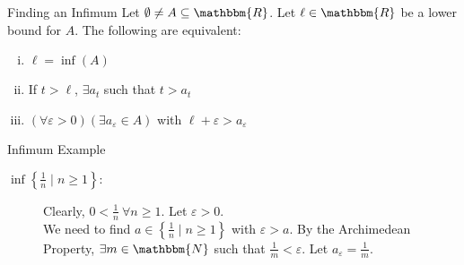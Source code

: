 \documentclass[10pt]{extarticle}
\newcommand{\N}{\mathbbm{N}}
\newcommand{\R}{\mathbbm{R}}
\begin{document}
  \begin{problem}{Finding an Infimum}
    Let $\emptyset \neq A \subseteq \R$. Let $\ell \in \R$ be a lower bound for $A$. The following are equivalent:
    \begin{enumerate}[(i)]
      \item $\ell = \inf(A)$
      \item If $t > \ell$, $\exists a_t$ such that $t > a_t$
      \item $(\forall \varepsilon > 0)(\exists a_{\varepsilon}\in A)$ with $\ell + \varepsilon > a_{\varepsilon}$
    \end{enumerate}
  \end{problem}
  \begin{problem}{Infimum Example}
    \begin{description}
      \item[$\inf\left\{\frac{1}{n}\mid n\geq 1\right\}:$] Clearly, $0 < \frac{1}{n}~\forall n \geq 1$. Let $\varepsilon > 0$.\\

        We need to find $a\in\left\{\frac{1}{n}\mid n\geq 1\right\}$ with $\varepsilon > a$. By the Archimedean Property, $\exists m\in\N$ such that $\frac{1}{m} < \varepsilon$. Let $a_{\varepsilon} = \frac{1}{m}$.
    \end{description}
  \end{problem}
\end{document}
